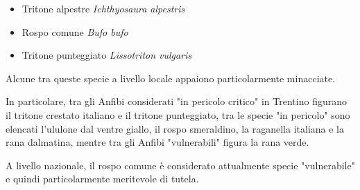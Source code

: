 \documentclass[11pt,a4paper,twoside]{memoir}
\begin{document}
\begin{itemize}\itemsep0pt
  \item Tritone alpestre \emph{Ichthyosaura alpestris}
  \item Rospo comune \emph{Bufo bufo}
  \item Tritone punteggiato \emph{Lissotriton vulgaris}
\end{itemize}

Alcune tra queste specie a livello locale appaiono particolarmente minacciate.

In particolare, tra gli Anfibi considerati "in pericolo critico" in Trentino figurano il tritone crestato italiano e il tritone punteggiato, tra le specie "in pericolo" sono elencati l'ululone dal ventre giallo, il rospo smeraldino, la raganella italiana e la rana dalmatina, mentre tra gli Anfibi "vulnerabili" figura la rana verde.

A livello nazionale, il rospo comune è considerato attualmente specie "vulnerabile" e quindi particolarmente meritevole di tutela.
\end{document}
